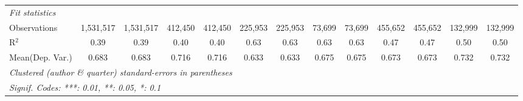 \begin{tabular}{lcccccccccccc}
   \midrule
   \emph{Fit statistics}\\
   Observations                             & 1,531,517     & 1,531,517      & 412,450       & 412,450        & 225,953     & 225,953         & 73,699        & 73,699   & 455,652       & 455,652         & 132,999       & 132,999\\  
   R$^2$                                    & 0.39          & 0.39           & 0.40          & 0.40           & 0.63        & 0.63            & 0.63          & 0.63     & 0.47          & 0.47            & 0.50          & 0.50\\  
Mean(Dep. Var.) & 0.683 & 0.683 & 0.716 & 0.716 & 0.633 & 0.633 & 0.675 & 0.675 & 0.673 & 0.673 & 0.732 & 0.732 \\
   \midrule \midrule
   \multicolumn{13}{l}{\emph{Clustered (author \& quarter) standard-errors in parentheses}}\\
   \multicolumn{13}{l}{\emph{Signif. Codes: ***: 0.01, **: 0.05, *: 0.1}}\\
\end{tabular}
\par\endgroup
